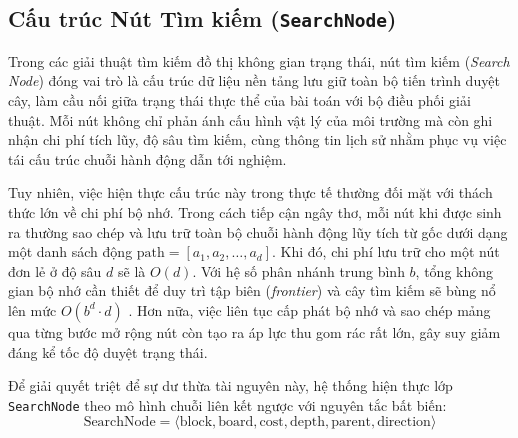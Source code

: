 \subsection{Cấu trúc Nút Tìm kiếm (\texttt{SearchNode})}
\label{subsec:search_node}
Trong các giải thuật tìm kiếm đồ thị không gian trạng thái, nút tìm kiếm (\textit{Search Node})
đóng vai trò là cấu trúc dữ liệu nền tảng lưu giữ toàn bộ tiến trình duyệt cây, làm cầu nối
giữa trạng thái thực thể của bài toán với bộ điều phối giải thuật. Mỗi nút không chỉ phản ánh
cấu hình vật lý của môi trường mà còn ghi nhận chi phí tích lũy, độ sâu tìm kiếm, cùng thông tin
lịch sử nhằm phục vụ việc tái cấu trúc chuỗi hành động dẫn tới nghiệm.

Tuy nhiên, việc hiện thực cấu trúc này trong thực tế thường đối mặt với thách thức lớn về chi phí bộ nhớ.
Trong cách tiếp cận ngây thơ, mỗi nút khi được sinh ra thường sao chép
và lưu trữ toàn bộ chuỗi hành động lũy tích từ gốc dưới dạng một danh sách động $\text{path} = [a_1, a_2, \dots, a_d]$.
Khi đó, chi phí lưu trữ cho một nút đơn lẻ ở độ sâu $d$ sẽ là $O(d)$. Với hệ số phân nhánh trung bình $b$,
tổng không gian bộ nhớ cần thiết để duy trì tập biên (\textit{frontier}) và cây tìm kiếm sẽ bùng nổ lên mức
$O(b^d \cdot d)$ \cite{russell2020aima}. Hơn nữa, việc liên tục cấp phát bộ nhớ và sao chép mảng qua từng
bước mở rộng nút còn tạo ra áp lực thu gom rác rất lớn, gây suy giảm
đáng kể tốc độ duyệt trạng thái.

Để giải quyết triệt để sự dư thừa tài nguyên này, hệ thống hiện thực lớp \texttt{SearchNode} theo mô hình
chuỗi liên kết ngược với nguyên tắc bất biến:
\begin{equation}
    \text{SearchNode} = \langle \text{block}, \text{board}, \text{cost},
    \text{depth}, \text{parent}, \text{direction} \rangle
\end{equation}

